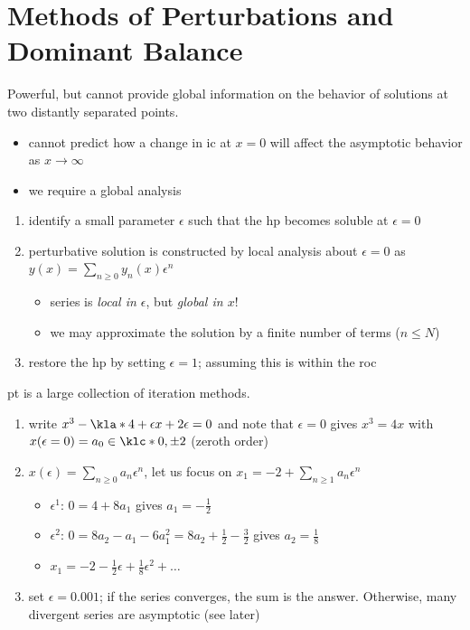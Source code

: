 \documentclass[english, parskip=full]{scrartcl}
\title{\Title}
\author{\Author}
\date{\today}
\newcommand{\definition}[2]{\begin{tcolorbox}[colback=colorbackgrounddefinition,colframe=colordefinition, breakable,enhanced,title=\textbf{#1}.]#2\end{tcolorbox}}
\newcommand{\note}[1]{\begin{tcolorbox}[colback=colorbackgroundnote,colframe=colornote, breakable,enhanced]#1\end{tcolorbox}}
\newcommand{\example}[3]{\begin{tcolorbox}[colback=colorbackgroundexample,colframe=colorexample, breakable,enhanced,title={\textbf{#1}: #2.}]#3\end{tcolorbox}}
\begin{document}
\maketitle  %

\section{Methods of Perturbations and Dominant Balance}

\definition{Local Analysis}{Powerful, but cannot provide global information on the behavior of solutions at two distantly separated points.
\begin{itemize}
\item[$\Rightarrow$] cannot predict how a change in \gls{ic} at $x=0$ will affect the asymptotic behavior as $x\rightarrow\infty$
\item[$\Rightarrow$] we require a global analysis
\end{itemize}}
\definition{\gls{pt}}{\begin{enumerate}
\item identify a small parameter $\epsilon$ such that the \gls{hp} becomes soluble at $\epsilon=0$
\item perturbative solution is constructed by local analysis about $\epsilon=0$ as $y(x) = \sum_{n\ge 0} y_n(x) \epsilon^n$
\begin{itemize}
\item[$\Rightarrow$] series is \emph{local in $\epsilon$}, but \emph{global in $x$}!
\item[$\Rightarrow$] we may approximate the solution by a finite number of terms ($n\le N$)
\end{itemize}
\item restore the \gls{hp} by setting $\epsilon=1$; assuming this is within the \gls{roc}
\end{enumerate}}
\note{\gls{pt} is a large collection of iteration methods.}
\example{Cubic Equation}{$x^3 - 4.001x + 0.002 = 0$}{\begin{enumerate}
\item write $x^3 - \kla*{4+\epsilon}x + 2\epsilon=0$ and note that $\epsilon=0$ gives $x^3=4x$ with $x(\epsilon=0) = a_0 \in \klc*{0,\pm 2}$ (zeroth order)
\item $x(\epsilon) = \sum_{n\ge 0} a_n \epsilon^n$, let us focus on $x_1 = -2 + \sum_{n\ge 1} a_n \epsilon^n$
\begin{itemize}
\item $\epsilon^1$: $0 = 4 + 8a_1$ gives $a_1 = -\frac{1}{2}$
\item $\epsilon^2$: $0 = 8a_2 - a_1 - 6a_1^2 = 8a_2 + \frac{1}{2} - \frac{3}{2}$ gives $a_2 = \frac{1}{8}$
\item[$\Rightarrow$] $x_1 = -2 - \frac{1}{2}\epsilon + \frac{1}{8} \epsilon^2 + \dots$
\end{itemize}
\item set $\epsilon=0.001$; if the series converges, the sum is the answer. Otherwise, many divergent series are asymptotic (see later)
\end{enumerate}
}
\end{document}
